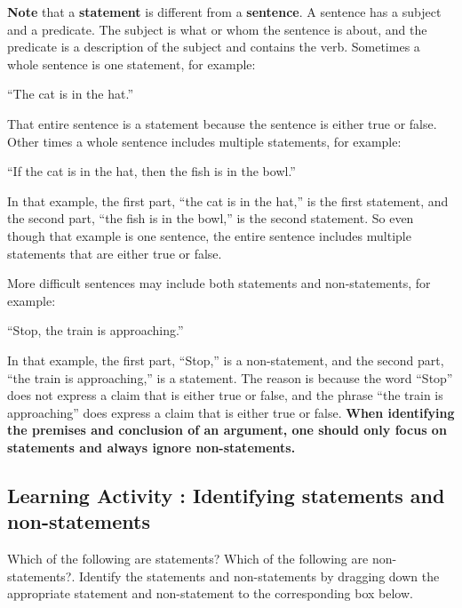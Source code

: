 \documentclass[
]{book}
\begin{document}
\begin{caution}
\textbf{Note} that a \textbf{statement} is different from a \textbf{sentence}. A sentence has a subject and a predicate. The subject is what or whom the sentence is about, and the predicate is a description of the subject and contains the verb. Sometimes a whole sentence is one statement, for example:

``The cat is in the hat.''
\end{caution}

That entire sentence is a statement because the sentence is either true or false. Other times a whole sentence includes multiple statements, for example:

``If the cat is in the hat, then the fish is in the bowl.''

In that example, the first part, ``the cat is in the hat,'' is the first statement, and the second part, ``the fish is in the bowl,'' is the second statement. So even though that example is one sentence, the entire sentence includes multiple statements that are either true or false.

More difficult sentences may include both statements and non-statements, for example:

``Stop, the train is approaching.''

In that example, the first part, ``Stop,'' is a non-statement, and the second part, ``the train is approaching,'' is a statement. The reason is because the word ``Stop'' does not express a claim that is either true or false, and the phrase ``the train is approaching'' does express a claim that is either true or false. \textbf{When identifying the premises and conclusion of an argument, one should only focus on statements and always ignore non-statements.}

\hypertarget{learning-activity-identifying-statements-and-non-statements}{%
\subsection*{Learning Activity : Identifying statements and non-statements}\label{learning-activity-identifying-statements-and-non-statements}}

Which of the following are statements? Which of the following are non-statements?. Identify the statements and non-statements by dragging down the appropriate statement and non-statement to the corresponding box below.
\end{document}
